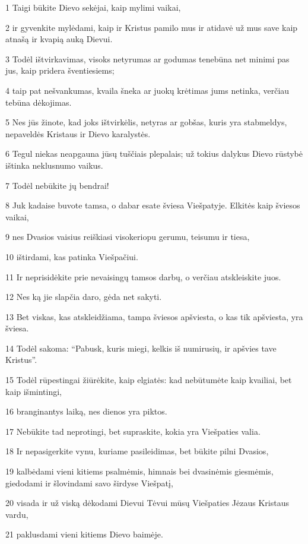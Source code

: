 \par 1 Taigi būkite Dievo sekėjai, kaip mylimi vaikai, 
\par 2 ir gyvenkite mylėdami, kaip ir Kristus pamilo mus ir atidavė už mus save kaip atnašą ir kvapią auką Dievui. 
\par 3 Todėl ištvirkavimas, visoks netyrumas ar godumas tenebūna net minimi pas jus, kaip pridera šventiesiems; 
\par 4 taip pat nešvankumas, kvaila šneka ar juokų krėtimas jums netinka, verčiau tebūna dėkojimas. 
\par 5 Nes jūs žinote, kad joks ištvirkėlis, netyras ar gobšas, kuris yra stabmeldys, nepaveldės Kristaus ir Dievo karalystės. 
\par 6 Tegul niekas neapgauna jūsų tuščiais plepalais; už tokius dalykus Dievo rūstybė ištinka neklusnumo vaikus. 
\par 7 Todėl nebūkite jų bendrai! 
\par 8 Juk kadaise buvote tamsa, o dabar esate šviesa Viešpatyje. Elkitės kaip šviesos vaikai,­ 
\par 9 nes Dvasios vaisius reiškiasi visokeriopu gerumu, teisumu ir tiesa,­ 
\par 10 ištirdami, kas patinka Viešpačiui. 
\par 11 Ir neprisidėkite prie nevaisingų tamsos darbų, o verčiau atskleiskite juos. 
\par 12 Nes ką jie slapčia daro, gėda net sakyti. 
\par 13 Bet viskas, kas atskleidžiama, tampa šviesos apšviesta, o kas tik apšviesta, yra šviesa. 
\par 14 Todėl sakoma: “Pabusk, kuris miegi, kelkis iš numirusių, ir apšvies tave Kristus”. 
\par 15 Todėl rūpestingai žiūrėkite, kaip elgiatės: kad nebūtumėte kaip kvailiai, bet kaip išmintingi, 
\par 16 branginantys laiką, nes dienos yra piktos. 
\par 17 Nebūkite tad neprotingi, bet supraskite, kokia yra Viešpaties valia. 
\par 18 Ir nepasigerkite vynu, kuriame pasileidimas, bet būkite pilni Dvasios, 
\par 19 kalbėdami vieni kitiems psalmėmis, himnais bei dvasinėmis giesmėmis, giedodami ir šlovindami savo širdyse Viešpatį, 
\par 20 visada ir už viską dėkodami Dievui Tėvui mūsų Viešpaties Jėzaus Kristaus vardu, 
\par 21 paklusdami vieni kitiems Dievo baimėje. 
